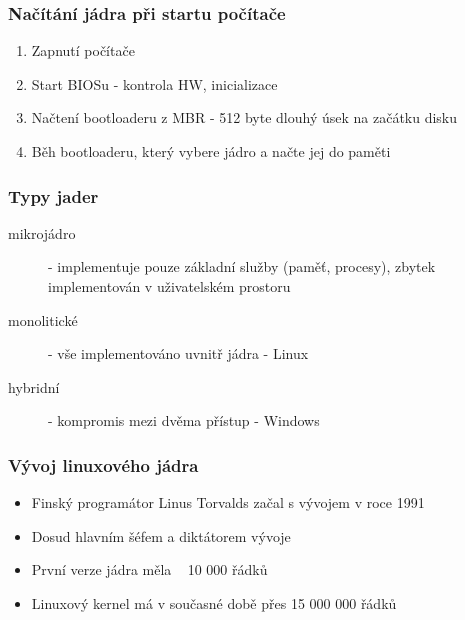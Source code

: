\documentclass[professionalfonts,svgnames]{beamer}
\begin{document}
\begin{frame}
\frametitle{Načítání jádra při startu počítače}
\begin{enumerate} %
	\item Zapnutí počítače
	\item Start BIOSu - kontrola HW, inicializace
	\item Načtení bootloaderu z MBR - 512 byte dlouhý úsek na začátku disku
	\item Běh bootloaderu, který vybere jádro a načte jej do paměti
\end{enumerate}
\end{frame}

\begin{frame}
\frametitle{Typy jader}
\begin{description} %
	\item [mikrojádro] - implementuje pouze základní služby (paměť, procesy), zbytek implementován v uživatelském prostoru
	\item [monolitické] - vše implementováno uvnitř jádra - Linux
	\item [hybridní] - kompromis mezi dvěma přístup - Windows
\end{description}
\end{frame}

\begin{frame}
\frametitle{Vývoj linuxového jádra}
\begin{itemize} %
	\item Finský programátor Linus Torvalds začal s vývojem v roce 1991
	\item Dosud hlavním šéfem a diktátorem vývoje
	\item První verze jádra měla ~ 10 000 řádků
	\item Linuxový kernel má v současné době přes 15 000 000 řádků
\end{itemize}
\end{frame}
\end{document}
